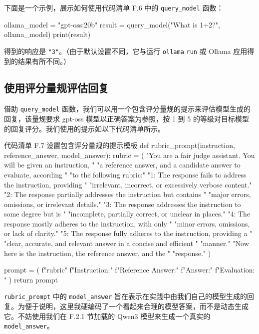 下面是一个示例，展示如何使用代码清单 F.6 中的 \texttt{query\_model} 函数：

\begin{codebox}
ollama_model = "gpt-oss:20b"
result = query_model("What is 1+2?", ollama_model)
print(result)
\end{codebox}

得到的响应是 \texttt{"}\texttt{3}\texttt{"}。（由于默认设置不同，它与运行 \texttt{ollama} \texttt{run} 或 Ollama 应用得到的结果有所不同。）

\subsection{使用评分量规评估回复}

借助 \texttt{query\_model} 函数，我们可以用一个包含评分量规的提示来评估模型生成的回复，该量规要求 gpt-oss 模型以正确答案为参照，按 1 到 5 的等级对目标模型的回复评分。我们使用的提示如以下代码清单所示。

\begin{codeboxt}{代码清单 F.7 设置包含评分量规的提示模板}
def rubric_prompt(instruction, reference_answer, model_answer):
    rubric = (
        "You are a fair judge assistant. You will be given an instruction, "
        "a reference answer, and a candidate answer to evaluate, according "
        "to the following rubric:\n\n"
        "1: The response fails to address the instruction, providing "
        "irrelevant, incorrect, or excessively verbose content.\n"
        "2: The response partially addresses the instruction but contains "
        "major errors, omissions, or irrelevant details.\n"
        "3: The response addresses the instruction to some degree but is "
        "incomplete, partially correct, or unclear in places.\n"
        "4: The response mostly adheres to the instruction, with only "
        "minor errors, omissions, or lack of clarity.\n"
        "5: The response fully adheres to the instruction, providing a "
        "clear, accurate, and relevant answer in a concise and efficient "
        "manner.\n\n"
        "Now here is the instruction, the reference answer, and the "
        "response.\n"
    )

    prompt = (
        f"{rubric}\n"
        f"Instruction:\n\n"
        f"Reference Answer:\n\n"
        f"Answer:\n\n"
        f"Evaluation: "
    )
    return prompt
\end{codeboxt}

\texttt{rubric\_prompt} 中的 \texttt{model\_answer} 旨在表示在实践中由我们自己的模型生成的回复。为便于说明，这里我硬编码了一个看起来合理的模型答案，而不是动态生成它。不妨使用我们在 F.2.1 节加载的 Qwen3 模型来生成一个真实的 \texttt{model\_answer}。

